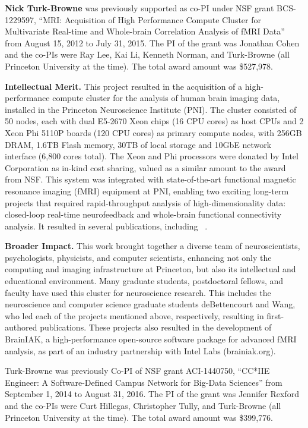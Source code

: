 

\textbf{Nick Turk-Browne} was previously supported as co-PI under NSF
grant BCS-1229597, ``MRI: Acquisition of High Performance Compute
Cluster for Multivariate Real-time and Whole-brain Correlation
Analysis of fMRI Data'' from August 15, 2012 to July 31, 2015. The PI
of the grant was Jonathan Cohen and the co-PIs were Ray Lee, Kai Li,
Kenneth Norman, and Turk-Browne (all Princeton University at the
time). The total award amount was \$527,978.

{\bf Intellectual Merit.} This project resulted in the acquisition of
a high-performance compute cluster for the analysis of human brain
imaging data, installed in the Princeton Neuroscience Institute (PNI).
The cluster consisted of 50 nodes, each with dual E5-2670 Xeon chips
(16 CPU cores) as host CPUs and 2 Xeon Phi 5110P boards (120 CPU
cores) as primary compute nodes, with 256GB DRAM, 1.6TB Flash memory,
30TB of local storage and 10GbE network interface (6,800 cores total).
The Xeon and Phi processors were donated by Intel Corporation as
in-kind cost sharing, valued as a similar amount to the award from
NSF. This system was integrated with state-of-the-art functional
magnetic resonance imaging (fMRI) equipment at PNI, enabling two
exciting long-term projects that required rapid-throughput analysis of
high-dimensionality data: closed-loop real-time neurofeedback and
whole-brain functional connectivity analysis. It resulted in several
publications, including
~\citep{Cohen:2017,deBettencourt:2015,Turk-Browne:2013,Wang:2015}.

{\bf Broader Impact.} This work brought together a diverse team of
neuroscientists, psychologists, physicists, and computer scientists,
enhancing not only the computing and imaging infrastructure at
Princeton, but also its intellectual and educational environment. Many
graduate students, postdoctoral fellows, and faculty have used this
cluster for neuroscience research. This includes the neuroscience and
computer science graduate students deBettencourt and Wang, who led
each of the projects mentioned above, respectively, resulting in
first-authored publications. These projects also resulted in the
development of BrainIAK, a high-performance open-source software
package for advanced fMRI analysis, as part of an industry partnership
with Intel Labs (brainiak.org).

\vskip10pt \noindent Turk-Browne was previously Co-PI of NSF grant
ACI-1440750, ``CC*IIE Engineer: A Software-Defined Campus Network for
Big-Data Sciences'' from September 1, 2014 to August 31, 2016. The PI
of the grant was Jennifer Rexford and the co-PIs were Curt Hillegas,
Christopher Tully, and Turk-Browne (all Princeton University at the
time). The total award amount was \$399,776.

